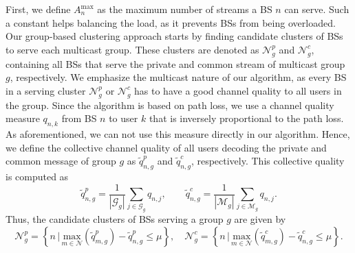 \documentclass[12pt,draftcls,onecolumn]{IEEEtran}
\theoremstyle{remark}
\theoremstyle{definition}
\begin{document}
{First, we define $A_n^{\text{max}}$ as the maximum number of streams a BS $n$ can serve. Such a constant helps balancing the load, as it prevents BSs from being overloaded. Our group-based clustering approach starts by finding candidate clusters of BSs to serve each multicast group. These clusters are denoted as $\mathcal{N}_g^p$ and $\mathcal{N}_g^c$, containing all BSs that serve the private and common stream of multicast group $g$, respectively. We emphasize the multicast nature of our algorithm, as every BS in a serving cluster $\mathcal{N}_g^p$ or $\mathcal{N}_g^c$ has to have a good channel quality to all users in the group. Since the algorithm is based on path loss, we use a channel quality measure $q_{n,k}$ from BS $n$ to user $k$ that is inversely proportional to the path loss. As aforementioned, we can not use this measure directly in our algorithm. Hence, we define the collective channel quality of all users decoding the private and common message of group $g$ as $\tilde{q}_{n,g}^p$ and $\tilde{q}_{n,g}^c$, respectively. This collective quality is computed as 
\begin{equation}
	\tilde{q}_{n,g}^p = \frac{1}{|\mathcal{G}_g|}\sum_{j\in\mathcal{G}_g} q_{n,j}, \qquad \tilde{q}_{n,g}^c = \frac{1}{|\mathcal{M}_g|}\sum_{j\in\mathcal{M}_g} q_{n,j}.
\end{equation}
Thus, the candidate clusters of BSs serving a group $g$ are given by
\begin{equation}
	\mathcal{N}_g^p = \left\{ n \, \Big|\, \underset{m\in\mathcal{N}}{\text{max}}( \tilde{q}_{m,g}^p ) - \tilde{q}_{n,g}^p \leq \mu \right\}, \quad \mathcal{N}_g^c = \left\{ n \, \Big|\, \underset{m\in\mathcal{N}}{\text{max}}( \tilde{q}_{m,g}^c ) - \tilde{q}_{n,g}^c \leq \mu \right\}. \label{eq:ngo}
\end{equation}
}
\end{document}
